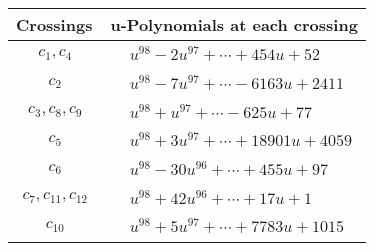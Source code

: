 \documentclass[1p]{elsarticle_modified}
\theoremstyle{definition}
\begin{document}
\begin{tabular}{m{50pt}|m{274pt}}
Crossings & \hspace{64pt}u-Polynomials at each crossing \\
\hline $$\begin{aligned}c_{1},c_{4}\end{aligned}$$&$\begin{aligned}
&u^{98}-2 u^{97}+\cdots+454 u+52
\end{aligned}$\\
\hline $$\begin{aligned}c_{2}\end{aligned}$$&$\begin{aligned}
&u^{98}-7 u^{97}+\cdots-6163 u+2411
\end{aligned}$\\
\hline $$\begin{aligned}c_{3},c_{8},c_{9}\end{aligned}$$&$\begin{aligned}
&u^{98}+u^{97}+\cdots-625 u+77
\end{aligned}$\\
\hline $$\begin{aligned}c_{5}\end{aligned}$$&$\begin{aligned}
&u^{98}+3 u^{97}+\cdots+18901 u+4059
\end{aligned}$\\
\hline $$\begin{aligned}c_{6}\end{aligned}$$&$\begin{aligned}
&u^{98}-30 u^{96}+\cdots+455 u+97
\end{aligned}$\\
\hline $$\begin{aligned}c_{7},c_{11},c_{12}\end{aligned}$$&$\begin{aligned}
&u^{98}+42 u^{96}+\cdots+17 u+1
\end{aligned}$\\
\hline $$\begin{aligned}c_{10}\end{aligned}$$&$\begin{aligned}
&u^{98}+5 u^{97}+\cdots+7783 u+1015
\end{aligned}$\\
\hline
\end{tabular}\\~\\
\newpage\renewcommand{\arraystretch}{1}
\end{document}
